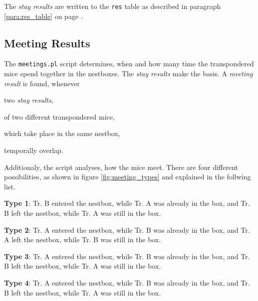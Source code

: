 The \textit{stay results} are written to the \lstinline|res| table as described in paragraph \ref{para:res_table} on page \pageref{para:res_table}.

\subsection{Meeting Results}
\label{subsec:meetingres}

The \lstinline|meetings.pl| script determines, when and how many time the transpondered mice spend together in the nestboxes. The \textit{stay results} make the basis. A \textit{meeting result} is found, whenever

\begin{mylist}
\item two \textit{stay results},
\item of two different transpondered mice,
\item which take place in the same nestbox,
\item temporally overlap.
\end{mylist}

Additionaly, the script analyses, how the mice meet. There are four different possibilities, as shown in figure \ref{fig:meeting_types} and explained in the follwing list.

\begin{mydesc}
\item \textbf{Type 1}: Tr. B entered the nestbox, while Tr. A was already in the box, and Tr. B left the nestbox, while Tr. A was still in the box. 
\item \textbf{Type 2}: Tr. A entered the nestbox, while Tr. B was already in the box, and Tr. A left the nestbox, while Tr. B was still in the box. 
\item \textbf{Type 3}: Tr. A entered the nestbox, while Tr. B was already in the box, and Tr. B left the nestbox, while Tr. A was still in the box. 
\item \textbf{Type 4}: Tr. A entered the nestbox, while Tr. B was already in the box, and Tr. B left the nestbox, while Tr. A was still in the box. 
\end{mydesc}

